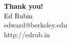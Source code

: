 \documentclass[english,10pt,aspectratio=1610]{beamer}
\begin{document}
\begin{frame}
  \bigskip\bigskip
  \textcolor{black}{\large \textcolor{my-purple}{\textbf{Thank you!}}}
  \\ \bigskip\bigskip
  \textcolor{black}{Ed Rubin}
  \\
  \textcolor{my-mid-grey}{edward@berkeley.edu}
  \\
  \textcolor{my-mid-grey}{http://edrub.in}
\end{frame}
\end{document}
